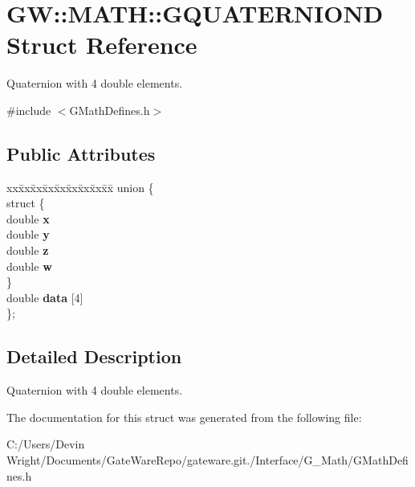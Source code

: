 \hypertarget{struct_g_w_1_1_m_a_t_h_1_1_g_q_u_a_t_e_r_n_i_o_n_d}{}\section{GW\+:\+:M\+A\+TH\+:\+:G\+Q\+U\+A\+T\+E\+R\+N\+I\+O\+ND Struct Reference}
\label{struct_g_w_1_1_m_a_t_h_1_1_g_q_u_a_t_e_r_n_i_o_n_d}


Quaternion with 4 double elements.  




{\ttfamily \#include $<$G\+Math\+Defines.\+h$>$}

\subsection*{Public Attributes}
\begin{DoxyCompactItemize}
\item 
\mbox{\label{struct_g_w_1_1_m_a_t_h_1_1_g_q_u_a_t_e_r_n_i_o_n_d_ae549f754f2f182bce994f6e7f1daf553}} 
\begin{tabbing}
xx\=xx\=xx\=xx\=xx\=xx\=xx\=xx\=xx\=\kill
union \{\\
\mbox{\label{union_g_w_1_1_m_a_t_h_1_1_g_q_u_a_t_e_r_n_i_o_n_d_1_1_0D24_ae5bbc9fad6ef88c3f9c1a5171c52741d}} 
\>struct \{\\
\>\>double {\bfseries x}\\
\>\>double {\bfseries y}\\
\>\>double {\bfseries z}\\
\>\>double {\bfseries w}\\
\>\} \\
\>double {\bfseries data} \mbox{[}4\mbox{]}\\
\}; \\

\end{tabbing}\end{DoxyCompactItemize}


\subsection{Detailed Description}
Quaternion with 4 double elements. 

The documentation for this struct was generated from the following file\+:\begin{DoxyCompactItemize}
\item 
C\+:/\+Users/\+Devin Wright/\+Documents/\+Gate\+Ware\+Repo/gateware.\+git./\+Interface/\+G\+\_\+\+Math/G\+Math\+Defines.\+h\end{DoxyCompactItemize}
